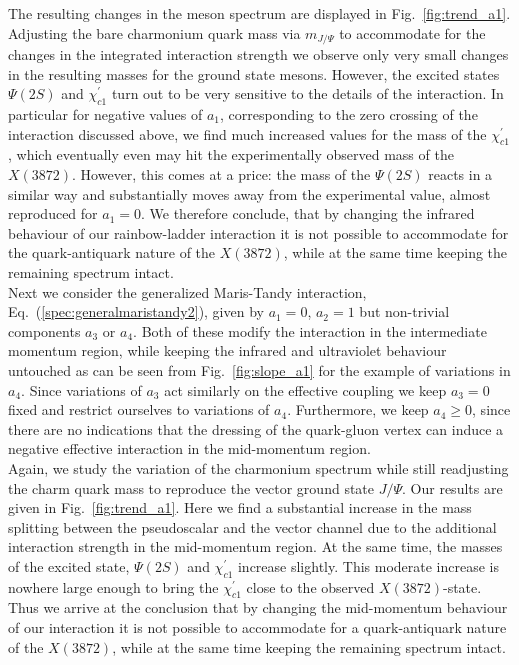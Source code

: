 The resulting changes in the meson spectrum are displayed in 
Fig.~\ref{fig:trend_a1}. Adjusting the bare charmonium quark mass via $m_{J/\Psi}$
to accommodate for the changes in the integrated interaction strength we
observe only very small changes in the resulting masses for the ground state mesons.
However, the excited states $\Psi(2S)$ and $\chi_{c1}^{\prime}$ turn out to be very sensitive 
to the details of the interaction. In particular for negative values of $a_1$,
corresponding to the zero crossing of the interaction discussed above, we find much
increased values for the mass of the $\chi_{c1}^{\prime}$, which eventually even may 
hit the experimentally observed mass of the $X(3872)$. However, this comes at a price: 
the mass of the $\Psi(2S)$ reacts in a similar way and substantially moves away from 
the experimental value, almost reproduced for $a_1=0$. We therefore conclude, that 
by changing the infrared behaviour of our rainbow-ladder interaction it is not possible 
to accommodate for the quark-antiquark nature of the $X(3872)$, while at the same time 
keeping the remaining spectrum intact. \\

Next we consider the generalized Maris-Tandy interaction, Eq.~(\ref{spec:generalmaristandy2}), 
given by $a_1=0$, $a_2=1$ but non-trivial components $a_3$ or $a_4$. Both of these modify 
the interaction in the intermediate momentum region, while keeping the infrared and
ultraviolet behaviour untouched as can be seen from Fig.~\ref{fig:slope_a1} for the 
example of variations in $a_4$. Since variations of $a_3$ act similarly on the effective
coupling we keep $a_3=0$ fixed and restrict ourselves to variations of $a_4$.
Furthermore, we keep $a_4 \ge 0$, since there are no indications that the dressing of the
quark-gluon vertex can induce a negative effective interaction in the mid-momentum region. \\

Again, we study the variation of the charmonium spectrum while still readjusting
the charm quark mass to reproduce the vector ground state $J/\Psi$. Our results
are given in Fig.~\ref{fig:trend_a1}. Here we find a substantial increase in the
mass splitting between the pseudoscalar and the vector channel due to the additional
interaction strength in the mid-momentum region. At the same time, the masses of the
excited state, $\Psi(2S)$ and $\chi_{c1}^{\prime}$ increase slightly. This moderate increase 
is nowhere large enough to bring the $\chi_{c1}^{\prime}$ close to the observed $X(3872)$-state.
Thus we arrive at the conclusion that by changing the mid-momentum behaviour of our 
interaction it is not possible to accommodate for a quark-antiquark nature of the 
$X(3872)$, while at the same time keeping the remaining spectrum intact.
%
%
%
%

